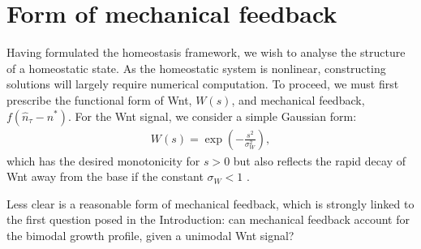 
\section{Form of mechanical feedback}
\label{sec:formofmechanicalfeedback}
Having formulated the homeostasis framework, we wish to analyse the structure of a homeostatic state. As the homeostatic system is nonlinear, constructing solutions will largely require numerical computation. To proceed, we must first prescribe the functional form of Wnt, $W(s)$, and mechanical feedback, $f(\hat n_\tau-n^*)$. For the Wnt signal, we consider a simple Gaussian form:
\begin{align}
W(s) = \exp\left(-\frac{s^2}{\sigma_W^2}\right),\label{eq:wntgaussian}
\end{align}
which has the desired monotonicity for $s > 0$ but also reflects the rapid decay of Wnt away from the base if the constant $\sigma_W < 1$ \cite{Marshman2002}.
 
Less clear is a reasonable form of mechanical feedback, which is strongly linked to the first question posed in the Introduction: can mechanical feedback account for the bimodal growth profile, given a unimodal Wnt signal? %

